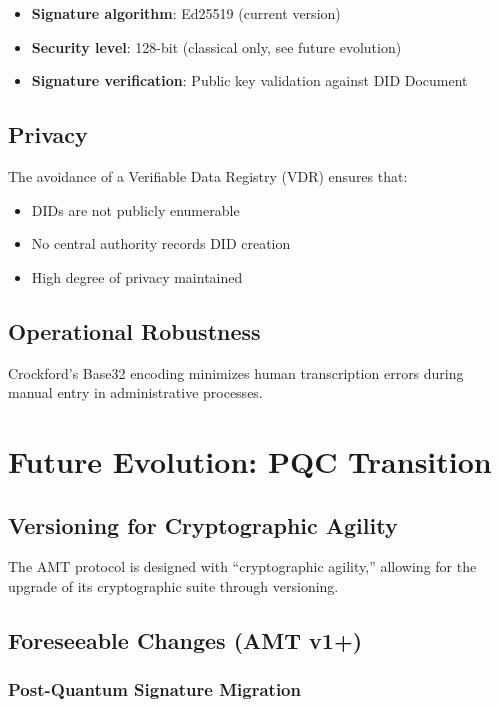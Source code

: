 \begin{itemize}
  \item \textbf{Signature algorithm}: Ed25519 (current version)
  \item \textbf{Security level}: 128-bit (classical only, see future evolution)
  \item \textbf{Signature verification}: Public key validation against DID Document
\end{itemize}

\subsection{Privacy}

The avoidance of a Verifiable Data Registry (VDR) ensures that:
\begin{itemize}
  \item DIDs are not publicly enumerable
  \item No central authority records DID creation
  \item High degree of privacy maintained
\end{itemize}

\subsection{Operational Robustness}

Crockford's Base32 encoding minimizes human transcription errors during manual entry in administrative processes.

\section{Future Evolution: PQC Transition}

\subsection{Versioning for Cryptographic Agility}

The AMT protocol is designed with ``cryptographic agility,'' allowing for the upgrade of its cryptographic suite through versioning.

\subsection{Foreseeable Changes (AMT v1+)}

\subsubsection{Post-Quantum Signature Migration}

